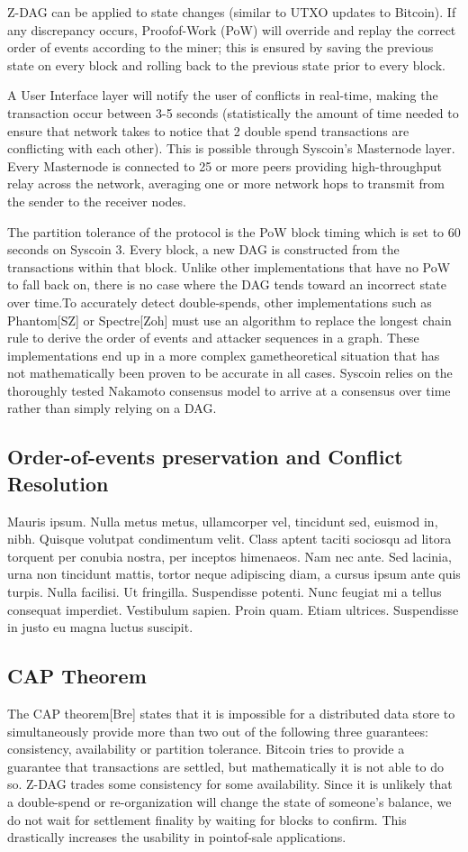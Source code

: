 \documentclass[peerreview]{ieeesyscoin}
\begin{document}
Z-DAG can be applied to state changes (similar to
UTXO updates to Bitcoin). If any discrepancy occurs, Proofof-Work (PoW) will override and replay the correct order
of events according to the miner; this is ensured by saving
the previous state on every block and rolling back to the
previous state prior to every block.

A User Interface layer will notify the user of conflicts
in real-time, making the transaction occur between 3-5
seconds (statistically the amount of time needed to ensure
that network takes to notice that 2 double spend transactions
are conflicting with each other). This is possible through
Syscoin’s Masternode layer. Every Masternode is connected
to 25 or more peers providing high-throughput relay across
the network, averaging one or more network hops to transmit
from the sender to the receiver nodes.

The partition tolerance of the protocol is the PoW block
timing which is set to 60 seconds on Syscoin 3. Every block,
a new DAG is constructed from the transactions within that
block. Unlike other implementations that have no PoW to
fall back on, there is no case where the DAG tends toward an
incorrect state over time.To accurately detect double-spends,
other implementations such as Phantom[SZ] or Spectre[Zoh]
must use an algorithm to replace the longest chain rule to
derive the order of events and attacker sequences in a graph.
These implementations end up in a more complex gametheoretical situation that has not mathematically been proven
to be accurate in all cases. Syscoin relies on the thoroughly
tested Nakamoto consensus model to arrive at a consensus
over time rather than simply relying on a DAG.

\subsection{Order-of-events preservation and Conflict Resolution}
Mauris ipsum. Nulla metus metus, ullamcorper vel, tincidunt sed, euismod in, nibh. Quisque volutpat condimentum velit. Class aptent taciti sociosqu ad litora torquent per conubia nostra, per inceptos himenaeos. Nam nec ante. Sed lacinia, urna non tincidunt mattis, tortor neque adipiscing diam, a cursus ipsum ante quis turpis. Nulla facilisi. Ut fringilla. Suspendisse potenti. Nunc feugiat mi a tellus consequat imperdiet. Vestibulum sapien. Proin quam. Etiam ultrices. Suspendisse in justo eu magna luctus suscipit. 


\subsection{CAP Theorem}
The CAP theorem[Bre] states that it is impossible for
a distributed data store to simultaneously provide more
than two out of the following three guarantees: consistency,
availability or partition tolerance. Bitcoin tries to provide a
guarantee that transactions are settled, but mathematically
it is not able to do so. Z-DAG trades some consistency for
some availability. Since it is unlikely that a double-spend or
re-organization will change the state of someone’s balance,
we do not wait for settlement finality by waiting for blocks
to confirm. This drastically increases the usability in pointof-sale applications.
\end{document}
